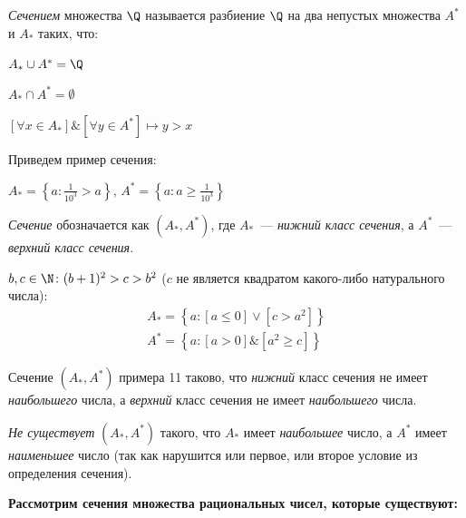 
\begin{definition}
\textit{Сечением} множества \(\Q\) называется разбиение \(\Q\) на два непустых множества
\(A^*\) и \(A_*\) таких, что:
\begin{properties}
\item \(A_* \cup A^* = \Q\)
\item \(A_* \cap A^* = \emptyset\)
\item \(\left[\forall x \in A_*\right] \& \left[\forall y \in A^*\right] \mapsto
    y > x\)
\end{properties}
\end{definition}

\begin{example} Приведем пример сечения:

\(A_* =  \left\{a\colon \frac{1}{10^3} > a\right\}\),
\(A^* = \left\{a\colon a \geq \frac{1}{10^3}\right\}\)
\end{example}

\textit{Сечение} обозначается как \(\left(A_*, A^*\right)\), где \(A_*\)~---
\textit{нижний класс сечения}, а \(A^*\)~--- \textit{верхний класс сечения}.

\begin{example}
\(b, c \in \N\colon (b + 1)^2 > c > b^2\) (\(c\) не является квадратом какого-либо
натурального числа):
\begin{gather}
A_* = \left\{a\colon \left[a \leq 0\right] \lor \left[c > a^2\right]\right\} \\
A^* = \left\{a\colon \left[a > 0\right] \& \left[a^2 \geq c\right]\right\}
\end{gather}
\end{example}

\begin{proposition}
Сечение \(\left(A_*, A^*\right)\) примера 11 таково, что \textit{нижний} класс сечения
не имеет \textit{наибольшего} числа, а \textit{верхний} класс сечения не
имеет \textit{наибольшего} числа.
\end{proposition}

\begin{proposition}
\textit{Не существует} \(\left(A_*, A^*\right)\) такого, что \(A_*\) имеет
\textit{наибольшее} число, а \(A^*\) имеет \textit{наименьшее} число
(так как нарушится или первое, или второе условие из определения сечения).
\end{proposition}

\textbf{Рассмотрим сечения множества рациональных чисел, которые существуют:}

